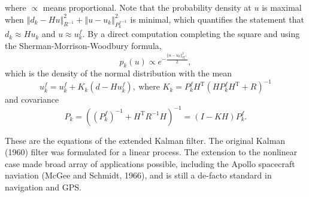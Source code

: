 \documentclass[12pt]{article}%
\begin{document}
where $\propto$ means proportional.
Note that the probability density at $u$ is maximal when $\left\Vert
d_{k}-Hu\right\Vert _{R^{-1}}^{2}+\left\Vert u-u_{k}\right\Vert _{{P_{k}^{f}}^{-1}}^{2}$
 is minimal, which quantifies the statement that $d_{k}\approx
Hu_{k}$ and $u\approx u_{k}^{f}$.  By a direct computation completing the
square and using the Sherman-Morrison-Woodbury formula, 
$$p_{k}\left(
		u
	   \right) \propto 
e^{-\frac{
	\left\Vert u-u_{k
	         }
	\right\Vert_
		{P_{k
		      }^{-1}
		}^{2}
	}
	{2}},
$$ 
which is the density of the normal distribution with the mean
$$
u_{k}^{f}=u_{k}^{f}+K_{k}(d-Hu_{k}^{f}),\ \text{where }K_{k}=P_{k}%
^{f}H^{\mathrm{T}}(HP_{k}^{f}H^{\mathrm{T}}+R)^{-1}%
$$
and covariance
$$
P_{k}=\left(  \left(  P_{k}^{f}\right)  ^{-1}+H^{\mathrm{T}}R^{-1}H\right)
^{-1}=(I-KH)P_{k}^{f}.
$$

These are the equations of the extended Kalman filter. The original Kalman (1960) filter was
formulated for a linear process. The extension to the
nonlinear case made broad array of applications possible, including the Apollo spacecraft naviation (McGee and Schmidt, 1966),  and is
still a de-facto standard in navigation and GPS.
\end{document}
